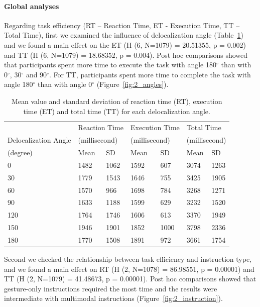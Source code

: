 \paragraph{Global analyses}
Regarding task efficiency (RT – Reaction Time, ET - Execution Time, TT – Total Time), first we examined the influence of delocalization angle (Table~\ref{tab:angles}) and we found a main effect on the ET (H (6, N=1079) = 20.51355, p = 0.002) and TT (H (6, N=1079) = 18.68352, p = 0.004). Post hoc comparisons showed that participants spent more time to execute the task with angle 180$^{\circ}$ than with 0$^{\circ}$, 30$^{\circ}$ and 90$^{\circ}$. For TT, participants spent more time to complete the task with angle 180$^{\circ}$ than with angle 0$^{\circ}$ (Figure~\ref{fig:2_angles}).

\begin{table}[!t]
\renewcommand{\arraystretch}{1.3}
\caption{Mean value and standard deviation of reaction time (RT), execution time (ET) and total time (TT) for each delocalization angle.}
\label{tab:angles}
\centering
\begin{tabular}{p{2.5cm} l l l l l l}
	\hline
     & \multicolumn{2}{p{3cm}}{Reaction Time} & \multicolumn{2}{p{3cm}}{Execution Time} & \multicolumn{2}{p{3cm}}{Total Time} \\
     Delocalization Angle & \multicolumn{2}{p{2.5cm}}{(millisecond)} & \multicolumn{2}{p{2.5cm}}{(millisecond)} & \multicolumn{2}{p{2.5cm}}{(millisecond)} \\
    (degree) & Mean & SD & Mean & SD & Mean & SD \\
    \hline
    0 & 1482 & 1062 & 1592 & 607 & 3074 & 1263 \\
   	30 & 1779 & 1543 & 1646 & 755 & 3425 & 1905 \\
	60 & 1570 & 966 & 1698 & 784 & 3268 & 1271 \\
	90 & 1633 & 1188 & 1599 & 629 & 3232 & 1520 \\
	120 & 1764 & 1746 & 1606 & 613 & 3370 & 1949 \\
	150 & 1946 & 1901 & 1852 & 1000 & 3798 & 2336 \\
	180 & 1770 & 1508 & 1891 & 972 & 3661 & 1754 \\ \hline
\end{tabular}
\end{table}

Second we checked the relationship between task efficiency and instruction type, and we found a main effect on RT (H (2, N=1078) = 86.98551, p = 0.00001) and TT (H (2, N=1079) = 41.48673, p = 0.00001). Post hoc comparisons showed that gesture-only instructions required the most time and the results were intermediate with multimodal instructions (Figure~\ref{fig:2_instruction}).


